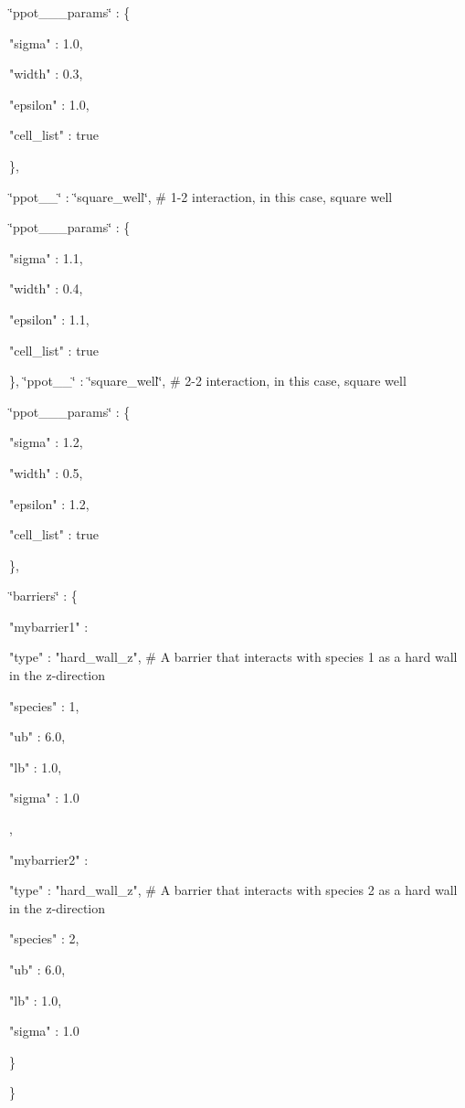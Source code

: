 \char`\"{}ppot\-\_\-\_\-\_\-params\char`\"{} \-: \{ \begin{DoxyVerb}"sigma" : 1.0,

"width" : 0.3,

"epsilon" : 1.0,

"cell_list"  : true
\end{DoxyVerb}


\},

\char`\"{}ppot\-\_\-\_\char`\"{} \-: \char`\"{}square\-\_\-well\char`\"{}, \# 1-\/2 interaction, in this case, square well

\char`\"{}ppot\-\_\-\_\-\_\-params\char`\"{} \-: \{ \begin{DoxyVerb}"sigma" : 1.1,

"width" : 0.4,

"epsilon" : 1.1,

"cell_list"  : true
\end{DoxyVerb}


\}, \char`\"{}ppot\-\_\-\_\char`\"{} \-: \char`\"{}square\-\_\-well\char`\"{}, \# 2-\/2 interaction, in this case, square well

\char`\"{}ppot\-\_\-\_\-\_\-params\char`\"{} \-: \{ \begin{DoxyVerb}"sigma" : 1.2,

"width" : 0.5,

"epsilon" : 1.2,

"cell_list"  : true
\end{DoxyVerb}


\},

\char`\"{}barriers\char`\"{} \-: \{ \begin{DoxyVerb}"mybarrier1" : {

    "type" : "hard_wall_z", # A barrier that interacts with species 1 as a hard wall in the z-direction

    "species" : 1,

    "ub" : 6.0,

    "lb" : 1.0,

    "sigma" : 1.0

},

"mybarrier2" : {

    "type" : "hard_wall_z", # A barrier that interacts with species 2 as a hard wall in the z-direction

    "species" : 2,

    "ub" : 6.0,

    "lb" : 1.0,

    "sigma" : 1.0

}
\end{DoxyVerb}


\}

\} 
